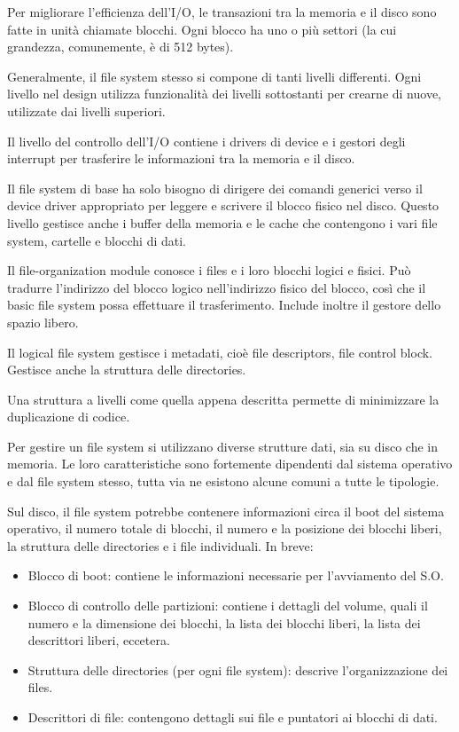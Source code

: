\documentclass[a4paper]{article}
\begin{document}
Per migliorare l'efficienza dell'I/O, le transazioni tra la memoria e il disco sono fatte in unità chiamate blocchi. Ogni blocco ha uno o più settori (la cui grandezza, comunemente, è di 512 bytes).

Generalmente, il file system stesso si compone di tanti livelli differenti. Ogni livello nel design utilizza funzionalità dei livelli sottostanti per crearne di nuove, utilizzate dai livelli superiori.

Il livello del controllo dell'I/O contiene i drivers di device e i gestori degli interrupt per trasferire le informazioni tra la memoria e il disco.

Il file system di base ha solo bisogno di dirigere dei comandi generici verso il device driver appropriato per leggere e scrivere il blocco fisico nel disco. Questo livello gestisce anche i buffer della memoria e le cache che contengono i vari file system, cartelle e blocchi di dati.

Il file-organization module conosce i files e i loro blocchi logici e fisici. Può tradurre l'indirizzo del blocco logico nell'indirizzo fisico del blocco, così che il basic file system possa effettuare il trasferimento. Include inoltre il gestore dello spazio libero.

Il logical file system gestisce i metadati, cioè file descriptors, file control block. Gestisce anche la struttura delle directories.

Una struttura a livelli come quella appena descritta permette di minimizzare la duplicazione di codice.
\newline

Per gestire un file system si utilizzano diverse strutture dati, sia su disco che in memoria. Le loro caratteristiche sono fortemente dipendenti dal sistema operativo e dal file system stesso, tutta via ne esistono alcune comuni a tutte le tipologie.

Sul disco, il file system potrebbe contenere informazioni circa il boot del sistema operativo, il numero totale di blocchi, il numero e la posizione dei blocchi liberi, la struttura delle directories e i file individuali. In breve:
\begin{itemize}
    \item Blocco di boot: contiene le informazioni necessarie per l'avviamento del S.O.
    \item Blocco di controllo delle partizioni: contiene i dettagli del volume, quali il numero e la dimensione dei blocchi, la lista dei blocchi liberi, la lista dei descrittori liberi, eccetera.
    \item Struttura delle directories (per ogni file system): descrive l'organizzazione dei files.
    \item Descrittori di file: contengono dettagli sui file e puntatori ai blocchi di dati.
\end{itemize}
\end{document}
